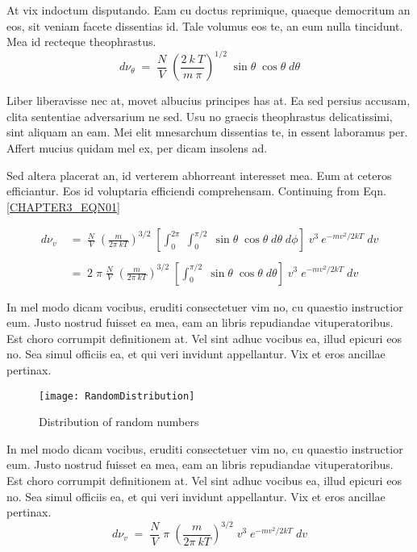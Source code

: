 At vix indoctum disputando. Eam cu doctus reprimique, quaeque democritum 
an eos, sit veniam facete dissentias id. Tale volumus eos te, an eum nulla 
tincidunt. Mea id recteque theophrastus.
\begin{equation}
  d\nu_\theta \;=\; \frac{N}{V}\;\left(\frac{2\:k\:T}{m\:\pi} \right)^{1/2}\;
                  \sin\theta\;\cos\theta\;d\theta
  \label{CHAPTER3_EQN01}
\end{equation}

Liber liberavisse nec at, movet albucius principes has at. Ea sed persius 
accusam, clita sententiae adversarium ne sed. Usu no graecis theophrastus 
delicatissimi, sint aliquam an eam. Mei elit mnesarchum dissentias te, in 
essent laboramus per. Affert mucius quidam mel ex, per dicam insolens ad.

Sed altera placerat an, id verterem abhorreant 
interesset mea. Eum at ceteros efficiantur. Eos id voluptaria efficiendi 
comprehensam. Continuing from Eqn. \eqref{CHAPTER3_EQN01}

\begin{align*}
  d\nu_v &\;=\; \frac{N}{V}\;\left(\frac{m}{2\pi\:kT} \right)^{3/2}\;
               \left[\int_{0}^{2\pi}\;\int_{0}^{\pi/2}\;\sin\theta\;\cos\theta\;d\theta\;d\phi \right]\;
               v^3\:e^{-mv^2/2kT}\;dv \\\\
         &\;=\; 2\;\pi\;\frac{N}{V}\;
               \left(\frac{m}{2\pi\:kT} \right)^{3/2}\;
               \left[\int_{0}^{\pi/2}\;\sin\theta\;\cos\theta\;d\theta \right]\;
               v^3\;e^{-mv^2/2kT}\;dv
\end{align*}

In mel modo dicam vocibus, eruditi consectetuer vim no, cu quaestio 
instructior eum. Justo nostrud fuisset ea mea, eam an libris repudiandae 
vituperatoribus. Est choro corrumpit definitionem at. Vel sint adhuc vocibus 
ea, illud epicuri eos no. Sea simul officiis ea, et qui veri invidunt 
appellantur. Vix et eros ancillae pertinax.
\begin{figure}[htb]
  \begin{center}
    \texttt{[image: RandomDistribution]}
  \end{center}
  \caption{Distribution of random numbers}
  \label{CHAPTER3_FIG01}
\end{figure}

In mel modo dicam vocibus, eruditi consectetuer vim no, cu quaestio 
instructior eum. Justo nostrud fuisset ea mea, eam an libris repudiandae 
vituperatoribus. Est choro corrumpit definitionem at. Vel sint adhuc vocibus 
ea, illud epicuri eos no. Sea simul officiis ea, et qui veri invidunt 
appellantur. Vix et eros ancillae pertinax.
\begin{equation}
  d\nu_v \;=\; \frac{N}{V}\;\pi\;
               \left(\frac{m}{2\pi\:kT} \right)^{3/2}\;
               v^3\;e^{-mv^2/2kT}\;dv
  \label{CHAPTER3_EQN02}
\end{equation}

